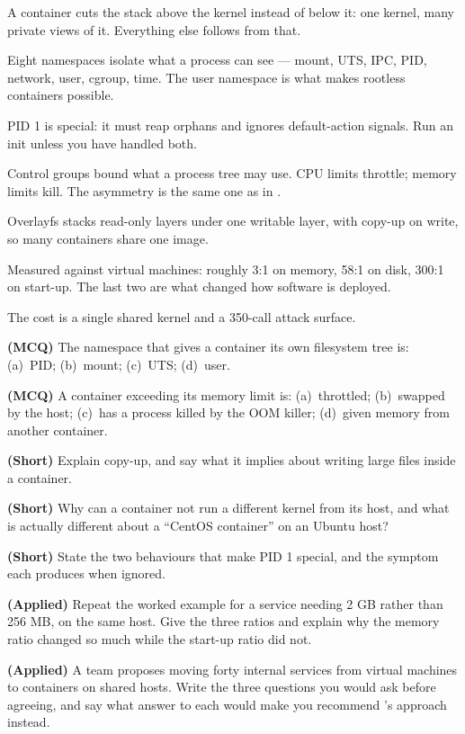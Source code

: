 \begin{chaptersummary}
\begin{tight}
  \item A container cuts the stack above the kernel instead of below it: one
        kernel, many private views of it. Everything else follows from that.
  \item Eight namespaces isolate what a process can see --- mount, UTS, IPC,
        PID, network, user, cgroup, time. The user namespace is what makes
        rootless containers possible.
  \item PID 1 is special: it must reap orphans and ignores default-action
        signals. Run an init unless you have handled both.
  \item Control groups bound what a process tree may use. CPU limits throttle;
        memory limits kill. The asymmetry is the same one as in .
  \item Overlayfs stacks read-only layers under one writable layer, with
        copy-up on write, so many containers share one image.
  \item Measured against virtual machines: roughly 3:1 on memory, 58:1 on disk,
        300:1 on start-up. The last two are what changed how software is
        deployed.
  \item The cost is a single shared kernel and a 350-call attack surface.
\end{tight}
\end{chaptersummary}

\begin{reviewq}
  \item \textbf{(MCQ)} The namespace that gives a container its own filesystem
        tree is: (a)~PID; (b)~mount; (c)~UTS; (d)~user.
  \item \textbf{(MCQ)} A container exceeding its memory limit is: (a)~throttled;
        (b)~swapped by the host; (c)~has a process killed by the OOM killer;
        (d)~given memory from another container.
  \item \textbf{(Short)} Explain copy-up, and say what it implies about writing
        large files inside a container.
  \item \textbf{(Short)} Why can a container not run a different kernel from
        its host, and what is actually different about a ``CentOS container''
        on an Ubuntu host?
  \item \textbf{(Short)} State the two behaviours that make PID 1 special, and
        the symptom each produces when ignored.
  \item \textbf{(Applied)} Repeat the worked example for a service needing
        2 GB rather than 256 MB, on the same host. Give the three ratios and
        explain why the memory ratio changed so much while the start-up ratio
        did not.
  \item \textbf{(Applied)} A team proposes moving forty internal services from
        virtual machines to containers on shared hosts. Write the three
        questions you would ask before agreeing, and say what answer to each
        would make you recommend 's approach instead.
\end{reviewq}
